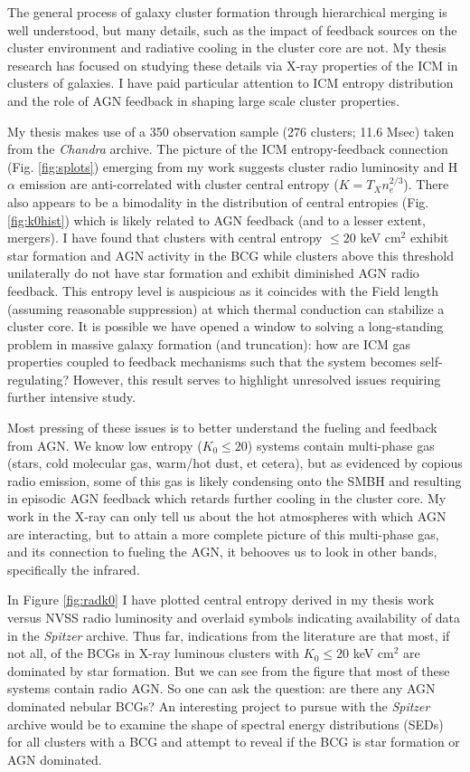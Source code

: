 \documentclass[11pt]{article}
\begin{document}
The general process of galaxy cluster formation through hierarchical
merging is well understood, but many details, such as the impact of
feedback sources on the cluster environment and radiative cooling in
the cluster core are not. My thesis research has focused on studying
these details via X-ray properties of the ICM in clusters of
galaxies. I have paid particular attention to ICM entropy
distribution and the role of AGN feedback in shaping large scale
cluster properties.

My thesis makes use of a 350 observation sample (276 clusters; 11.6
Msec) taken from the {\it Chandra} archive. The picture of the ICM
entropy-feedback connection (Fig. \ref{fig:splots}) emerging from my work
suggests cluster radio luminosity and H$\alpha$ emission are
anti-correlated with cluster central entropy ($K=T_Xn_e^{2/3}$). There
also appears to be a bimodality in the distribution of central
entropies (Fig. \ref{fig:k0hist}) which is likely related to AGN
feedback (and to a lesser extent, mergers). I have found that clusters
with central entropy $\leq 20$ keV cm$^2$ exhibit star formation and
AGN activity in the BCG while clusters above this threshold
unilaterally do not have star formation and exhibit diminished AGN
radio feedback. This entropy level is auspicious as it coincides with
the Field length (assuming reasonable suppression) at which thermal
conduction can stabilize a cluster core. It is possible we have opened
a window to solving a long-standing problem in massive galaxy
formation (and truncation): how are ICM gas properties coupled to
feedback mechanisms such that the system becomes self-regulating?
However, this result serves to highlight unresolved issues requiring
further intensive study.

Most pressing of these issues is to better understand the fueling and
feedback from AGN. We know low entropy ($K_0 \leq 20$) systems contain
multi-phase gas (stars, cold molecular gas, warm/hot dust, et cetera), but as
evidenced by copious radio emission, some of this gas is likely
condensing onto the SMBH and resulting in episodic AGN feedback which retards
further cooling in the cluster core. My work in the X-ray can
only tell us about the hot atmospheres with which AGN are interacting,
but to attain a more complete picture of this multi-phase gas, and its
connection to fueling the AGN, it behooves us to look in other bands,
specifically the infrared.

In Figure \ref{fig:radk0} I have plotted central entropy derived in
my thesis work versus NVSS radio luminosity and overlaid symbols
indicating availability of data in the {\it Spitzer} archive. Thus
far, indications from the literature are that most, if not all, of the
BCGs in X-ray luminous clusters with $K_0 \leq 20$ keV cm$^2$ are
dominated by star formation. But we can see from the figure that most of
these systems contain radio AGN. So one can ask the question: are
there any AGN dominated nebular BCGs? An interesting project to pursue
with the {\it Spitzer} archive would be to examine the shape of
spectral energy distributions (SEDs) for all clusters with a BCG and
attempt to reveal if the BCG is star formation or AGN dominated.
\end{document}
